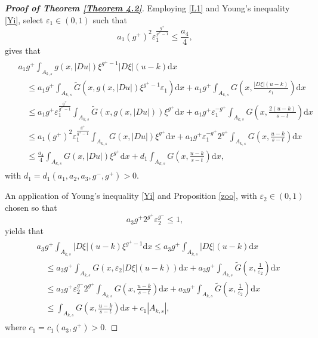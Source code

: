 \documentclass[10pt,reqno]{amsart}
\newcommand *\w{^\wedge}
\theoremstyle{definition}
\numberwithin{equation}{section}
\begin{document}
\begin{proof}[\textbf{Proof of Theorem \ref{Theorem 4.2}}]
 Employing \eqref{L1} and Young's inequality \eqref{Yi}, select \(\varepsilon_1 \in (0,1)\) such that
\[
a_1 (g^+)^2 \varepsilon_1^{\frac{g^+}{g^+-1}} \leq \frac{a_4}{4},
\]
 gives that
\begin{align}\label{4.32}
\begin{split}
&a_1 g^+ \int_{A_{k,s}} g(x,|Du|) \xi^{g^+-1} |D\xi|(u - k)  \mathrm{d}x \\
&\quad \leq a_1 g^+ \int_{A_{k,s}} \widetilde{G}\left(x, g(x,|Du|) \xi^{g^+-1}\varepsilon_1\right)  \mathrm{d}x + a_1 g^+ \int_{A_{k,s}} G\left(x, \frac{|D\xi|(u - k)}{\varepsilon_1}\right)  \mathrm{d}x \\
&\quad \leq a_1 g^+ \varepsilon_1^{\frac{g^+}{g^+-1}} \int_{A_{k,s}} \widetilde{G}\left(x, g(x,|Du|) \right) \xi^{g^+}  \mathrm{d}x + a_1 g^+ \varepsilon_1^{-g^+} \int_{A_{k,s}} G\left(x, \frac{2(u - k)}{s-t}\right)  \mathrm{d}x \\
&\quad \leq a_1 (g^+)^2 \varepsilon_1^{\frac{g^+}{g^+-1}} \int_{A_{k,s}} G(x,|Du|)  \xi^{g^+}  \mathrm{d}x + a_1 g^+ \varepsilon_1^{-g^+} 2^{g^+} \int_{A_{k,s}} G\left(x, \frac{u - k}{s-t}\right)  \mathrm{d}x \\
&\quad \leq \frac{a_4}{4} \int_{A_{k,s}} G(x,|Du|) \xi^{g^+}  \mathrm{d}x + d_1 \int_{A_{k,s}} G\left(x, \frac{u - k}{s - t} \right)  \mathrm{d}x,
\end{split}
\end{align}
with \(d_1 = d_1(a_1, a_2, a_3, g^-, g^+) > 0\).

 An application of Young's inequality \eqref{Yi} and Proposition \ref{zoo}, with \(\varepsilon_2 \in (0,1)\) chosen so that
\[
a_3g^+ 2^{g^+} \varepsilon_2^{g^-} \leq 1,
\]
yields that
\begin{align}\label{4.33}
\begin{split}
&a_3g^+ \int_{A_{k,s}} |D\xi|(u - k) \xi^{g^+-1}  \mathrm{d}x \leq a_3g^+ \int_{A_{k,s}} |D\xi|(u - k)  \mathrm{d}x \\
&\quad \leq a_3g^+ \int_{A_{k,s}} G\left(x, \varepsilon_2 |D\xi| (u - k)\right)  \mathrm{d}x + a_3g^+ \int_{A_{k,s}} \widetilde{G}\left(x, \frac{1}{\varepsilon_2} \right)  \mathrm{d}x \\
&\quad \leq a_3g^+\varepsilon_2^{g^-} 2^{g^+} \int_{A_{k,s}} G\left(x, \frac{u - k}{s-t}\right)  \mathrm{d}x + a_3g^+ \int_{A_{k,s}} \widetilde{G}\left(x, \frac{1}{\varepsilon_2} \right)  \mathrm{d}x \\
&\quad \leq \int_{A_{k,s}} G\left(x, \frac{u - k}{s - t} \right)  \mathrm{d}x + c_1 |A_{k,s}|,
\end{split}
\end{align}
where \(c_1 = c_1(a_3, g^+) > 0\).


\end{proof}
\end{document}
